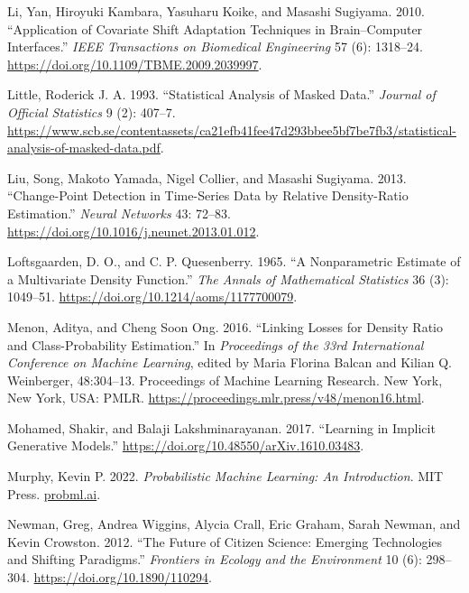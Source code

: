 \documentclass[
]{article}
\newlength{\cslhangindent}
\newenvironment{CSLReferences}[2] %
 {\begin{list}{}{%
  \setlength{\itemindent}{0pt}
  \setlength{\leftmargin}{0pt}
  \setlength{\parsep}{0pt}
  \ifodd #1
   \setlength{\leftmargin}{\cslhangindent}
   \setlength{\itemindent}{-1\cslhangindent}
  \fi
  \setlength{\itemsep}{#2\baselineskip}}}
 {\end{list}}
\begin{document}
\begin{CSLReferences}{1}{0}
Li, Yan, Hiroyuki Kambara, Yasuharu Koike, and Masashi Sugiyama. 2010.
{``Application of Covariate Shift Adaptation Techniques in
Brain--Computer Interfaces.''} \emph{IEEE Transactions on Biomedical
Engineering} 57 (6): 1318--24.
\url{https://doi.org/10.1109/TBME.2009.2039997}.

Little, Roderick J. A. 1993. {``Statistical Analysis of Masked Data.''}
\emph{Journal of Official Statistics} 9 (2): 407--7.
\url{https://www.scb.se/contentassets/ca21efb41fee47d293bbee5bf7be7fb3/statistical-analysis-of-masked-data.pdf}.

Liu, Song, Makoto Yamada, Nigel Collier, and Masashi Sugiyama. 2013.
{``Change-Point Detection in Time-Series Data by Relative Density-Ratio
Estimation.''} \emph{Neural Networks} 43: 72--83.
\url{https://doi.org/10.1016/j.neunet.2013.01.012}.

Loftsgaarden, D. O., and C. P. Quesenberry. 1965. {``{A Nonparametric
Estimate of a Multivariate Density Function}.''} \emph{The Annals of
Mathematical Statistics} 36 (3): 1049--51.
\url{https://doi.org/10.1214/aoms/1177700079}.

Menon, Aditya, and Cheng Soon Ong. 2016. {``Linking Losses for Density
Ratio and Class-Probability Estimation.''} In \emph{Proceedings of the
33rd International Conference on Machine Learning}, edited by Maria
Florina Balcan and Kilian Q. Weinberger, 48:304--13. Proceedings of
Machine Learning Research. New York, New York, USA: PMLR.
\url{https://proceedings.mlr.press/v48/menon16.html}.

Mohamed, Shakir, and Balaji Lakshminarayanan. 2017. {``Learning in
Implicit Generative Models.''}
\url{https://doi.org/10.48550/arXiv.1610.03483}.

Murphy, Kevin P. 2022. \emph{Probabilistic Machine Learning: An
Introduction}. MIT Press. \href{https://probml.ai}{probml.ai}.

Newman, Greg, Andrea Wiggins, Alycia Crall, Eric Graham, Sarah Newman,
and Kevin Crowston. 2012. {``The Future of Citizen Science: Emerging
Technologies and Shifting Paradigms.''} \emph{Frontiers in Ecology and
the Environment} 10 (6): 298--304. \url{https://doi.org/10.1890/110294}.


\end{CSLReferences}
\end{document}
